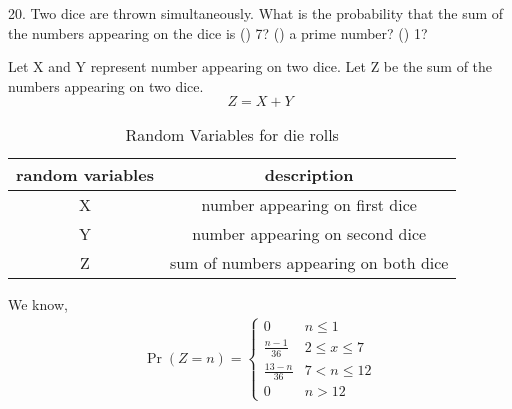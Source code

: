 \documentclass[]{article}
\begin{document}
\providecommand{\qfunc}[1]{\ensuremath{Q\left(#1\right)}}
\providecommand{\gauss}[2]{\mathcal{N}\ensuremath{\left(#1,#2\right)}}
\providecommand{\diff}[2]{\ensuremath{\frac{d{#1}}{d{#2}}}}
\providecommand{\myceil}[1]{\left \lceil #1 \right \rceil }
\newcommand\figref{Fig.~\ref}
\newcommand\tabref{Table~\ref}
\newcommand{\sinc}{\,\text{sinc}\,}
\newcommand{\rect}{\,\text{rect}\,}

\let\vec\mathbf

20. Two dice are thrown simultaneously. What is the probability that the sum of the numbers appearing on the dice is () 7? () a prime number? () 1?

\solution Let X and Y represent number appearing on two dice. Let Z be the sum of the numbers appearing on two dice.
$$Z=X+Y$$

\begin{table}[H]
\centering
\begin{tabular}{|c|c|}
\hline
random variables & description \\
\hline
X & number appearing on first dice \\
\hline
Y & number appearing on second dice \\
\hline
Z & sum of numbers appearing on both dice \\
\hline
\end{tabular}
\label{tab:ncert_exemplar/10/13/3/20}
\caption{Random Variables for die rolls}
\end{table}

 We know,
\begin{align}
\Pr(Z=n) = 
\begin{cases}
0 &  n \leq{1} \\
\frac{n-1}{36} &  2 \leq{x} \leq{7} \\
\frac{13-n}{36} &  7 < n \leq{12} \\
0 &  n>12
\label{eq:ncert_exemplar/10/13/3/20}
\end{cases}
\end{align}
\end{document}
